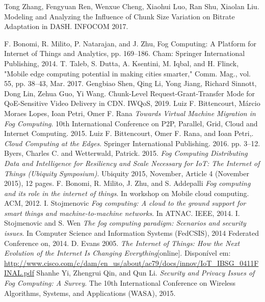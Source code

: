 \documentclass[a4paper, 11pt]{article}
\begin{document}
\begin{footnotesize}
\begin{thebibliography}{11}


 Tong Zhang, Fengyuan Ren, Wenxue Cheng, Xiaohui Luo, Ran Shu, Xiaolan Liu. Modeling and Analyzing the Influence of Chunk Size Variation on Bitrate Adaptation in DASH. INFOCOM 2017.

 F. Bonomi, R. Milito, P. Natarajan, and J. Zhu, Fog Computing: A Platform for Internet of Things and Analytics, pp. 169–186. Cham: Springer International Publishing, 2014.
 T. Taleb, S. Dutta, A. Ksentini, M. Iqbal, and H. Flinck, "Mobile edge computing potential in making cities smarter," Comm. Mag., vol. 55, pp. 38–43, Mar. 2017.
 Gengbiao Shen, Qing Li, Yong Jiang, Richard Sinnott, Dong Lin, Zehua Guo, Yi Wang. Chunk-Level Request-Grant-Transfer Mode for QoE-Sensitive Video Delivery in CDN. IWQoS, 2019.
 Luiz F. Bittencourt, Márcio Moraes Lopes, Ioan Petri, Omer F. Rana \emph{Towards Virtual Machine Migration in Fog Computing}. 10th International Conference on P2P, Parallel, Grid, Cloud and Internet Computing. 2015.
 Luiz F. Bittencourt, Omer F. Rana, and Ioan Petri,. \emph{Cloud Computing at the Edges}. Springer International Publishing. 2016. pp. 3–12.
  Byers, Charles C. and Wetterwald, Patrick. 2015. \emph{Fog Computing Distributing Data and Intelligence for Resiliency and Scale Necessary for IoT: The Internet of Things (Ubiquity Symposium)}. Ubiquity 2015, November, Article 4 (November 2015), 12 pages.
 F. Bonomi, R. Milito, J. Zhu, and S. Addepalli \emph{Fog computing and its role in the internet of things}. In workshop on Mobile cloud computing. ACM, 2012.
 I. Stojmenovic \emph{Fog computing: A cloud to the ground support for smart things and machine-to-machine networks}. In ATNAC. IEEE, 2014.
 I. Stojmenovic and S. Wen \emph{The fog computing paradigm: Scenarios and security issues}. In Computer Science and Information Systems (FedCSIS), 2014 Federated Conference on, 2014.
  D. Evans 2005. \emph{The Internet of Things: How the Next Evolution of the Internet Is Changing Everything}[online]. Disponível em: \url{http://www.cisco.com/c/dam/en_us/about/ac79/docs/innov/IoT_IBSG_0411FINAL.pdf}
  Shanhe Yi, Zhengrui Qin, and Qun Li. \emph{Security and Privacy Issues of Fog Computing: A Survey}. The 10th International Conference on Wireless Algorithms, Systems, and Applications (WASA), 2015.



\end{thebibliography}
\end{footnotesize}
\end{document}
